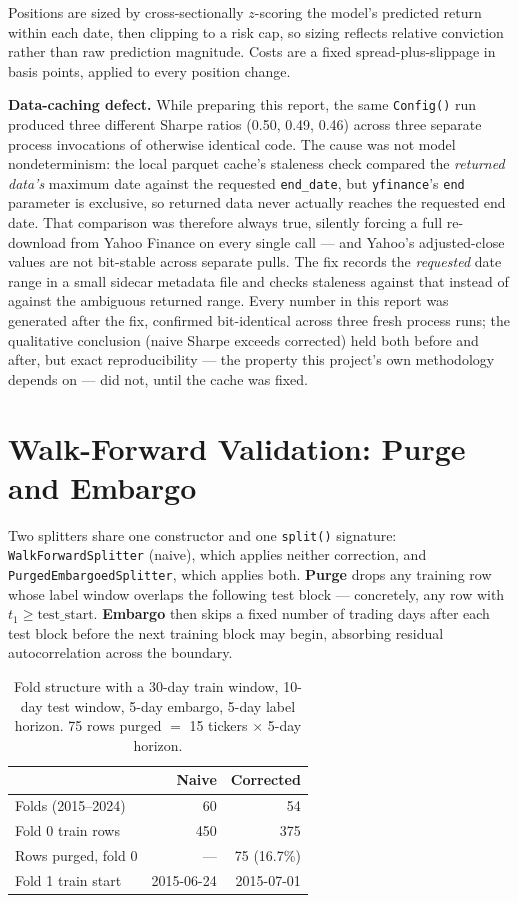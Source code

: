 \documentclass[10pt]{article}
\begin{document}
Positions are sized by cross-sectionally $z$-scoring the model's predicted return within each date, then clipping to a risk cap, so sizing reflects relative conviction rather than raw prediction magnitude. Costs are a fixed spread-plus-slippage in basis points, applied to every position change.

\textbf{Data-caching defect.} While preparing this report, the same \texttt{Config()} run produced three different Sharpe ratios (0.50, 0.49, 0.46) across three separate process invocations of otherwise identical code. The cause was not model nondeterminism: the local parquet cache's staleness check compared the \emph{returned data's} maximum date against the requested \texttt{end\_date}, but \texttt{yfinance}'s \texttt{end} parameter is exclusive, so returned data never actually reaches the requested end date. That comparison was therefore always true, silently forcing a full re-download from Yahoo Finance on every single call --- and Yahoo's adjusted-close values are not bit-stable across separate pulls. The fix records the \emph{requested} date range in a small sidecar metadata file and checks staleness against that instead of against the ambiguous returned range. Every number in this report was generated after the fix, confirmed bit-identical across three fresh process runs; the qualitative conclusion (naive Sharpe exceeds corrected) held both before and after, but exact reproducibility --- the property this project's own methodology depends on --- did not, until the cache was fixed.

\section{Walk-Forward Validation: Purge and Embargo}

Two splitters share one constructor and one \texttt{split()} signature: \texttt{WalkForwardSplitter} (naive), which applies neither correction, and \texttt{PurgedEmbargoedSplitter}, which applies both. \textbf{Purge} drops any training row whose label window overlaps the following test block --- concretely, any row with $t_1 \geq \text{test\_start}$. \textbf{Embargo} then skips a fixed number of trading days after each test block before the next training block may begin, absorbing residual autocorrelation across the boundary.

\begin{table}[h]
\centering
\begin{tabular}{lrr}
\toprule
 & Naive & Corrected \\
\midrule
Folds (2015--2024) & 60 & 54 \\
Fold 0 train rows & 450 & 375 \\
Rows purged, fold 0 & --- & 75 (16.7\%) \\
Fold 1 train start & 2015-06-24 & 2015-07-01 \\
\bottomrule
\end{tabular}
\caption{Fold structure with a 30-day train window, 10-day test window, 5-day embargo, 5-day label horizon. 75 rows purged $=$ 15 tickers $\times$ 5-day horizon.}
\end{table}
\end{document}
